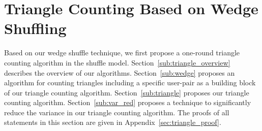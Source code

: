 \section{Triangle Counting Based on Wedge Shuffling}
\label{sec:triangle}
Based on our wedge shuffle technique, we first propose a 
one-round triangle counting algorithm in the shuffle model. 
% 
Section~\ref{sub:triangle_overview} describes the overview of our algorithms. 
Section~\ref{sub:wedge} proposes an algorithm for counting triangles including a specific user-pair 
as a building block of our triangle counting algorithm. 
Section~\ref{sub:triangle} proposes 
our triangle counting algorithm. 
Section~\ref{sub:var_red} proposes a technique to significantly reduce the variance in our triangle counting algorithm. 
The proofs of all statements in this section are given in Appendix~\ref{sec:triangle_proof}. 


